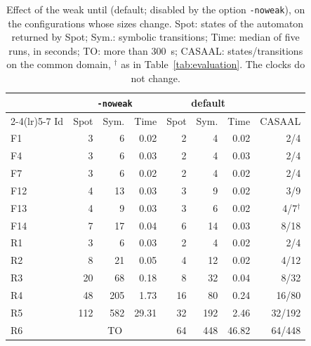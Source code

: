 \begin{table}[t]
\centering
\caption{Effect of the weak until (default; disabled by the option \texttt{-noweak}), on the configurations whose sizes change.  Spot: states of the automaton returned by Spot; Sym.: symbolic transitions; Time: median of five runs, in seconds; TO: more than 300~s; CASAAL: states/transitions on the common domain, $^\dagger$ as in Table~\ref{tab:evaluation}.  The clocks do not change.}
\label{tab:weak}
\footnotesize
\setlength{\tabcolsep}{3pt}
\begin{tabular}{@{}lrrrrrrr@{}}
\toprule
 & \multicolumn{3}{c}{\texttt{-noweak}} & \multicolumn{3}{c}{default} & \\
\cmidrule(lr){2-4}\cmidrule(lr){5-7}
Id & Spot & Sym. & Time & Spot & Sym. & Time & CASAAL\\
\midrule
F1 & 3 & 6 & 0.02 & 2 & 4 & 0.02 & 2/4\\
F4 & 3 & 6 & 0.03 & 2 & 4 & 0.03 & 2/4\\
F7 & 3 & 6 & 0.02 & 2 & 4 & 0.02 & 2/4\\
F12 & 4 & 13 & 0.03 & 3 & 9 & 0.02 & 3/9\\
F13 & 4 & 9 & 0.03 & 3 & 6 & 0.02 & 4/7$^\dagger$\\
F14 & 7 & 17 & 0.04 & 6 & 14 & 0.03 & 8/18\\
R1 & 3 & 6 & 0.03 & 2 & 4 & 0.02 & 2/4\\
R2 & 8 & 21 & 0.05 & 4 & 12 & 0.02 & 4/12\\
R3 & 20 & 68 & 0.18 & 8 & 32 & 0.04 & 8/32\\
R4 & 48 & 205 & 1.73 & 16 & 80 & 0.24 & 16/80\\
R5 & 112 & 582 & 29.31 & 32 & 192 & 2.46 & 32/192\\
R6 & \multicolumn{3}{c}{TO} & 64 & 448 & 46.82 & 64/448\\
\bottomrule
\end{tabular}
\end{table}
